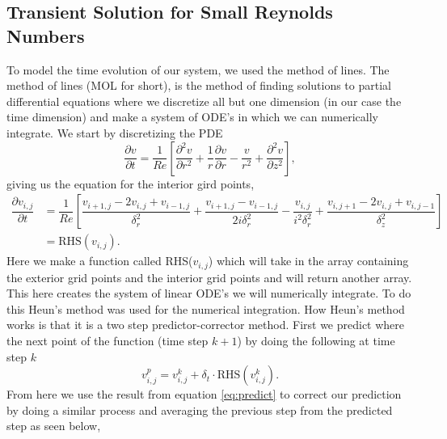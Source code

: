 \documentclass[11pt,letterpaper]{article}
\newcommand{\fdel}[2]{\dfrac{\partial{#1}}{\partial {#2}}} %
\newcommand{\sdel}[2]{\dfrac{\partial^2{#1}}{\partial{#2}^2}} %
\newcommand{\fpar}[1]{\left({#1}\right)} %
\newcommand{\fbrac}[1]{\left[{#1}\right]} %
\begin{document}
\subsection{Transient Solution for Small Reynolds Numbers}  
To model the time evolution of our system, we used the method of lines. The method of lines (MOL for short), is the method of finding solutions to partial differential equations where we discretize all but one dimension (in our case the time dimension) and make a system of ODE's in which we can numerically integrate. We start by discretizing the PDE
\begin{equation}\label{eq:Time evo Linear}
    \fdel{v}{t} = \dfrac{1}{Re}\fbrac{\sdel{v}{r} + \dfrac{1}{r}\fdel{v}{r} - \dfrac{v}{r^2} + \sdel{v}{z}},
\end{equation}
giving us the equation for the interior gird points, 
\begin{align}
    \fdel{v_{i,j}}{t} &= \dfrac{1}{Re} \fbrac{\dfrac{v_{i+1,j} -2v_{i,j} + v_{i-1,j}}{\delta_r^2} + \dfrac{v_{i+1,j}-v_{i-1,j}}{2i\delta_r^2} - \dfrac{v_{i,j}}{i^2\delta^2_r} +\dfrac{v_{i,j+1} - 2v_{i,j} + v_{i,j-1}}{\delta_z^2}}\nonumber\\
    &= \text{RHS}(v_{i,j}). 
\end{align}
Here we make a function called RHS($v_{i,j}$) which will take in the array containing the exterior grid points and the interior grid points and will return another array. This here creates the system of linear ODE's we will numerically integrate. To do this Heun's method was used for the numerical integration. How Heun's method works is that it is a two step predictor-corrector method. First we predict where the next point of the function (time step $k+1$) by doing the following at time step $k$
\begin{equation}\label{eq:predict}
    v^p_{i,j} = v^k_{i,j} + \delta_t \cdot \text{RHS}\fpar{v^k_{i,j}}.
\end{equation}
From here we use the result from equation \eqref{eq:predict} to correct our prediction by doing a similar process and averaging the previous step from the predicted step as seen below,  
\end{document}
